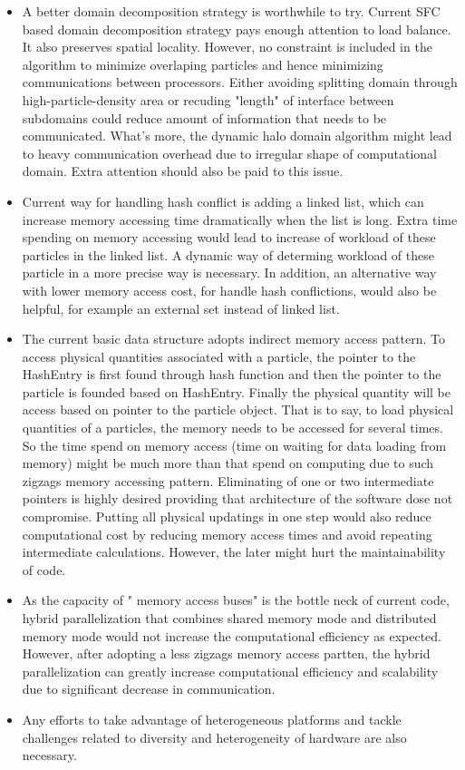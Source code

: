 \begin{itemize}
\item {A better domain decomposition strategy is worthwhile to try. Current SFC based domain decomposition strategy pays enough attention to load balance. It also preserves spatial locality. However, no constraint is included in the algorithm to minimize overlaping particles and hence minimizing communications between processors. Either avoiding splitting domain through high-particle-density area or recuding "length" of interface between subdomains could reduce amount of information that needs to be communicated. What's more, the dynamic halo domain algorithm might lead to heavy communication overhead due to irregular shape of computational domain. Extra attention should also be paid to this issue.}
\item {Current way for handling hash conflict is adding a linked list, which can increase memory accessing time dramatically when the list is long. Extra time spending on memory accessing would lead to increase of workload of these particles in the linked list. A dynamic way of determing workload of these particle in a more precise way is necessary. In addition, an alternative way with lower memory access cost, for handle hash conflictions, would also be helpful, for example an external set instead of linked list.}
\item {The current basic data structure adopts indirect memory access pattern. To access physical quantities associated with a particle, the pointer to the HashEntry is first found through hash function and then the pointer to the particle is founded based on HashEntry. Finally the physical quantity will be access based on pointer to the particle object. That is to say, to load physical quantities of a particles, the memory needs to be accessed for several times.
So the time spend on memory access (time on waiting for data loading from memory) might be much more than that spend on computing due to such zigzags memory accessing pattern. Eliminating of one or two intermediate pointers is highly desired providing that architecture of the software dose not compromise. Putting all physical updatings in one step would also reduce computational cost by reducing memory access times and avoid repeating intermediate calculations. However, the later might hurt the maintainability of code.}
\item {As the capacity of " memory access buses" is the bottle neck of current code, hybrid parallelization that combines shared memory mode and distributed memory mode would not increase the computational efficiency as expected. However, after adopting a less zigzags memory access partten, the hybrid parallelization can greatly increase computational efficiency and scalability due to significant decrease in communication.}
\item {Any efforts to take advantage of heterogeneous platforms and tackle challenges related to diversity and heterogeneity of hardware are also necessary.}
\end{itemize}

